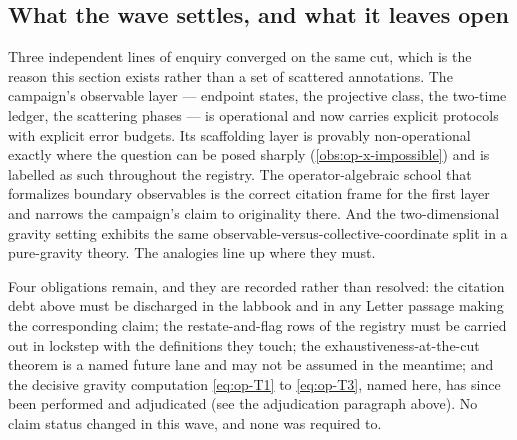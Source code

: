 \subsection{What the wave settles, and what it leaves open}

Three independent lines of enquiry converged on the same cut, which is the
reason this section exists rather than a set of scattered annotations. The
campaign's observable layer --- endpoint states, the projective class, the
two-time ledger, the scattering phases --- is operational and now carries
explicit protocols with explicit error budgets. Its scaffolding layer is
provably non-operational exactly where the question can be posed sharply
(\cref{obs:op-x-impossible}) and is labelled as such throughout the registry.
The operator-algebraic school that formalizes boundary observables is the
correct citation frame for the first layer and narrows the campaign's claim to
originality there. And the two-dimensional gravity setting exhibits the same
observable-versus-collective-coordinate split in a pure-gravity theory. The
analogies line up where they must.

Four obligations remain, and they are recorded rather than resolved: the
citation debt above must be discharged in the labbook and in any Letter passage
making the corresponding claim; the restate-and-flag rows of the registry must
be carried out in lockstep with the definitions they touch; the
exhaustiveness-at-the-cut theorem is a named future lane and may not be assumed
in the meantime; and the decisive gravity computation \eqref{eq:op-T1} to
\eqref{eq:op-T3}, named here, has since been performed and adjudicated (see
the adjudication paragraph above). No claim status changed in this
wave, and none was required to.
